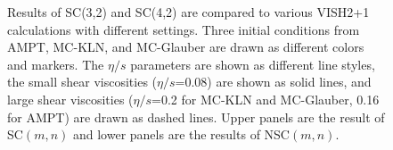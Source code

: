 \documentclass[ALICE,manyauthors]{cernphprep}
\begin{document}
\begin{figure}[!p]
\begin{center}
        \caption{Results of  SC(3,2) and SC(4,2) are compared to various VISH2+1 calculations with different settings. Three initial conditions from AMPT, MC-KLN, and MC-Glauber  are drawn as different colors and markers. The $\eta/s$ parameters are shown as different line styles, the small shear viscosities ($\eta/s$=0.08) are shown as solid lines, and large shear viscosities ($\eta/s$=0.2 for MC-KLN and MC-Glauber, 0.16 for AMPT) are drawn as dashed lines. Upper panels are the result of SC$(m,n)$ and lower panels are the results of NSC$(m,n)$.}
         \label{fig:Figure_4}
        \end{center}   
 \end{figure}
 
\end{document}
